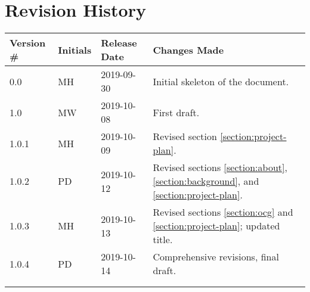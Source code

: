 \thispagestyle{empty}
\section*{Revision History}
\begin{table}[H]
\begin{tabular}{llll}
\hline
Version \# & Initials & Release Date & Changes Made \\ \hline
0.0 & MH & 2019-09-30 & Initial skeleton of the document.\\
1.0 & MW & 2019-10-08 & First draft.\\
1.0.1 & MH & 2019-10-09 & Revised section \ref{section:project-plan}.\\
1.0.2 & PD & 2019-10-12 & Revised sections \ref{section:about}, \ref{section:background}, and \ref{section:project-plan}.\\
1.0.3 & MH & 2019-10-13 & Revised sections \ref{section:ocg} and \ref{section:project-plan}; updated title.\\
1.0.4 & PD & 2019-10-14 & Comprehensive revisions, final draft.\\
 & & & \\
 & & & \\ \hline
\end{tabular}
\end{table}
